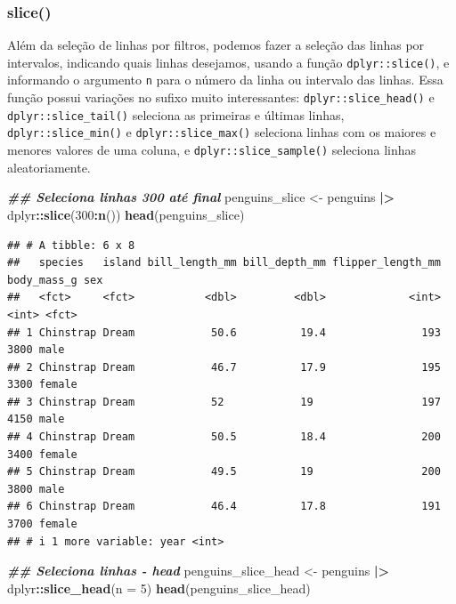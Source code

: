 \documentclass[
]{article}
\newenvironment{Shaded}{\begin{snugshade}}{\end{snugshade}}
\newcommand{\AttributeTok}[1]{\textcolor[rgb]{0.13,0.29,0.53}{#1}}
\newcommand{\DecValTok}[1]{\textcolor[rgb]{0.00,0.00,0.81}{#1}}
\newcommand{\DocumentationTok}[1]{\textcolor[rgb]{0.56,0.35,0.01}{\textbf{\textit{#1}}}}
\newcommand{\FunctionTok}[1]{\textcolor[rgb]{0.13,0.29,0.53}{\textbf{#1}}}
\newcommand{\NormalTok}[1]{#1}
\newcommand{\OtherTok}[1]{\textcolor[rgb]{0.56,0.35,0.01}{#1}}
\newcommand{\SpecialCharTok}[1]{\textcolor[rgb]{0.81,0.36,0.00}{\textbf{#1}}}
\begin{document}
\hypertarget{slice}{%
\subsubsection{slice()}\label{slice}}

Além da seleção de linhas por filtros, podemos fazer a seleção das linhas por intervalos, indicando quais linhas desejamos, usando a função \texttt{dplyr::slice()}, e informando o argumento \texttt{n} para o número da linha ou intervalo das linhas. Essa função possui variações no sufixo muito interessantes: \texttt{dplyr::slice\_head()} e \texttt{dplyr::slice\_tail()} seleciona as primeiras e últimas linhas, \texttt{dplyr::slice\_min()} e \texttt{dplyr::slice\_max()} seleciona linhas com os maiores e menores valores de uma coluna, e \texttt{dplyr::slice\_sample()} seleciona linhas aleatoriamente.

\begin{Shaded}
\begin{Highlighting}[]
\DocumentationTok{\#\# Seleciona linhas 300 até final}
\NormalTok{penguins\_slice }\OtherTok{\textless{}{-}}\NormalTok{ penguins }\SpecialCharTok{|\textgreater{}} 
\NormalTok{    dplyr}\SpecialCharTok{::}\FunctionTok{slice}\NormalTok{(}\DecValTok{300}\SpecialCharTok{:}\FunctionTok{n}\NormalTok{())}
\FunctionTok{head}\NormalTok{(penguins\_slice)}
\end{Highlighting}
\end{Shaded}

\begin{verbatim}
## # A tibble: 6 x 8
##   species   island bill_length_mm bill_depth_mm flipper_length_mm body_mass_g sex   
##   <fct>     <fct>           <dbl>         <dbl>             <int>       <int> <fct> 
## 1 Chinstrap Dream            50.6          19.4               193        3800 male  
## 2 Chinstrap Dream            46.7          17.9               195        3300 female
## 3 Chinstrap Dream            52            19                 197        4150 male  
## 4 Chinstrap Dream            50.5          18.4               200        3400 female
## 5 Chinstrap Dream            49.5          19                 200        3800 male  
## 6 Chinstrap Dream            46.4          17.8               191        3700 female
## # i 1 more variable: year <int>
\end{verbatim}

\begin{Shaded}
\begin{Highlighting}[]
\DocumentationTok{\#\# Seleciona linhas {-} head}
\NormalTok{penguins\_slice\_head }\OtherTok{\textless{}{-}}\NormalTok{ penguins }\SpecialCharTok{|\textgreater{}} 
\NormalTok{    dplyr}\SpecialCharTok{::}\FunctionTok{slice\_head}\NormalTok{(}\AttributeTok{n =} \DecValTok{5}\NormalTok{)}
\FunctionTok{head}\NormalTok{(penguins\_slice\_head)}
\end{Highlighting}
\end{Shaded}
\end{document}

